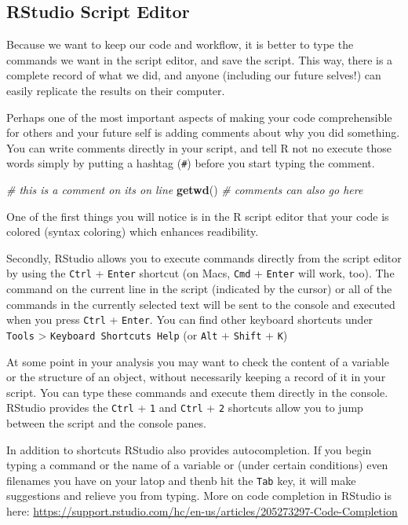 \documentclass[]{book}
\newenvironment{Shaded}{\begin{snugshade}}{\end{snugshade}}
\newcommand{\KeywordTok}[1]{\textcolor[rgb]{0.13,0.29,0.53}{\textbf{#1}}}
\newcommand{\CommentTok}[1]{\textcolor[rgb]{0.56,0.35,0.01}{\textit{#1}}}
\newcommand{\NormalTok}[1]{#1}
\begin{document}
\subsection{RStudio Script Editor}\label{rstudio-script-editor}

Because we want to keep our code and workflow, it is better to type the
commands we want in the script editor, and save the script. This way,
there is a complete record of what we did, and anyone (including our
future selves!) can easily replicate the results on their computer.

Perhaps one of the most important aspects of making your code
comprehensible for others and your future self is adding comments about
why you did something. You can write comments directly in your script,
and tell R not no execute those words simply by putting a hashtag
(\texttt{\#}) before you start typing the comment.

\begin{Shaded}
\begin{Highlighting}[]
\CommentTok{# this is a comment on its on line}
\KeywordTok{getwd}\NormalTok{() }\CommentTok{# comments can also go here}
\end{Highlighting}
\end{Shaded}

One of the first things you will notice is in the R script editor that
your code is colored (syntax coloring) which enhances readibility.

Secondly, RStudio allows you to execute commands directly from the
script editor by using the \texttt{Ctrl} + \texttt{Enter} shortcut (on
Macs, \texttt{Cmd} + \texttt{Enter} will work, too). The command on the
current line in the script (indicated by the cursor) or all of the
commands in the currently selected text will be sent to the console and
executed when you press \texttt{Ctrl} + \texttt{Enter}. You can find
other keyboard shortcuts under \texttt{Tools} \textgreater{}
\texttt{Keyboard\ Shortcuts\ Help} (or \texttt{Alt} + \texttt{Shift} +
\texttt{K})

At some point in your analysis you may want to check the content of a
variable or the structure of an object, without necessarily keeping a
record of it in your script. You can type these commands and execute
them directly in the console. RStudio provides the \texttt{Ctrl} +
\texttt{1} and \texttt{Ctrl} + \texttt{2} shortcuts allow you to jump
between the script and the console panes.

In addition to shortcuts RStudio also provides autocompletion. If you
begin typing a command or the name of a variable or (under certain
conditions) even filenames you have on your latop and thenb hit the
\texttt{Tab} key, it will make suggestions and relieve you from typing.
More on code completion in RStudio is here:
\url{https://support.rstudio.com/hc/en-us/articles/205273297-Code-Completion}
\end{document}
